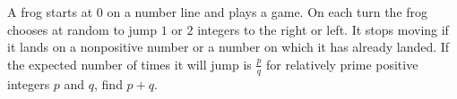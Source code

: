 A frog starts at $0$ on a number line and plays a game. On each turn the frog chooses at random to jump $1$ or $2$ integers to the right or left. It stops moving if it lands on a nonpositive number or a number on which it has already landed. If the expected number of times it will jump is $\frac{p}{q}$ for relatively prime positive integers $p$ and $q$, find $p+q$.
